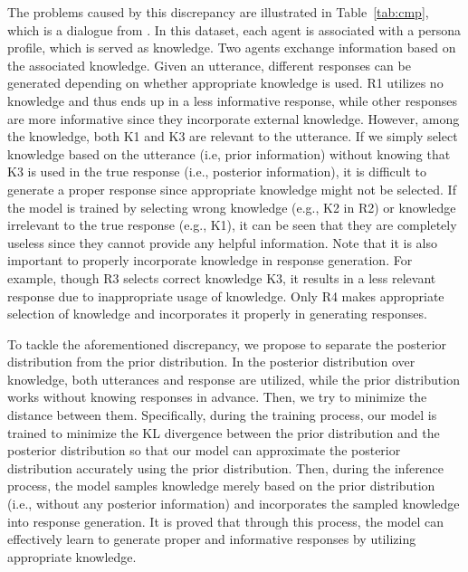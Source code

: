 \documentclass{article}
\begin{document}
The problems caused by this discrepancy are illustrated in Table~\ref{tab:cmp},
which is a dialogue from \cite{zhang2018personalizing}.
In this dataset, each agent is associated with a persona profile, which is served as knowledge. 
Two agents exchange information based on the associated knowledge.
Given an utterance,
different responses can be generated depending on whether appropriate knowledge is used.
R1 utilizes no knowledge and thus ends up in a less informative response,
while other responses are more informative since they incorporate external knowledge.
However, among the knowledge,
both K1 and K3 are relevant to the utterance.
If we simply select knowledge based on the utterance (i.e, prior information) 
without knowing that K3 is used in the true response (i.e., posterior information),
it is difficult to generate a proper response since appropriate knowledge might not be selected.
If the model is trained by selecting wrong knowledge (e.g., K2 in R2) 
or knowledge irrelevant to the true response (e.g., K1), 
it can be seen that they are completely useless since they cannot provide any helpful information.
%
Note that it is also important to properly incorporate knowledge in response generation.
For example, though R3 selects correct knowledge K3, 
it results in a less relevant response due to inappropriate usage of knowledge.
Only R4 makes appropriate selection of knowledge and incorporates it properly in generating responses.

To tackle the aforementioned discrepancy,
we propose to separate the posterior distribution from the prior distribution. 
In the posterior distribution over knowledge, 
both utterances and response are utilized, 
while the prior distribution works without knowing responses in advance. 
%
Then, we try to minimize the distance between them.
Specifically,
during the training process,
our model is trained to minimize the KL divergence between the prior distribution and the posterior distribution
so that our model can approximate the posterior distribution accurately using the prior distribution. 
Then, during the inference process, 
the model samples knowledge merely based on the prior distribution
(i.e., without any posterior information)
and incorporates the sampled knowledge into response generation. 
It is proved that through this process,
the model can effectively learn to generate proper and informative responses by utilizing appropriate knowledge.
\end{document}
